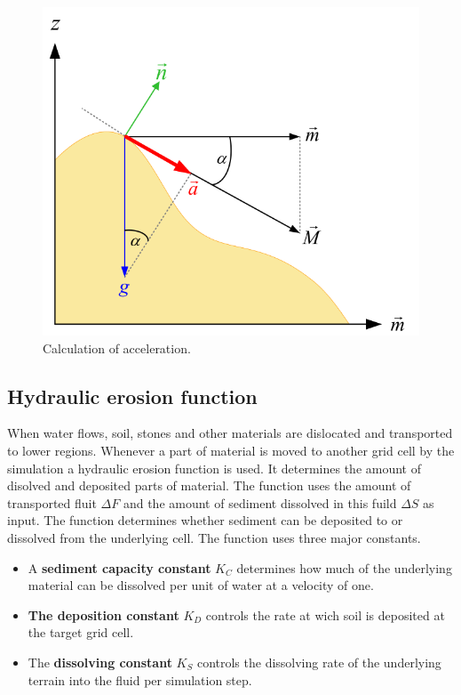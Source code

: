\begin{figure}[htb]
	\centering
	\includegraphics[width=.8\linewidth]{NWD05/acceleration}
	\caption{Calculation of acceleration.}
	\label{fig:calc_acceleration}
\end{figure}

\subsection{Hydraulic erosion function}
When water flows, soil, stones and other materials are dislocated and transported to lower regions. Whenever a part of material is moved to another grid cell by the simulation a hydraulic erosion function is used. It determines the amount of disolved and deposited parts of material. The function uses the amount of transported fluit $\Delta F$ and the amount of sediment dissolved in this fuild $\Delta S$ as input. The function determines whether sediment can be deposited to or dissolved from the underlying cell. The function uses three major constants. 
\begin{itemize}
\item A \textbf{sediment capacity constant} $K_C$ determines how much of the underlying material can be dissolved per unit of water at a velocity of one. 
\item \textbf{The deposition constant} $K_D$ controls the rate at wich soil is deposited at the target grid cell. 
\item The \textbf{dissolving constant} $K_S$ controls the dissolving rate of the underlying terrain into the fluid per simulation step.
\end{itemize}

